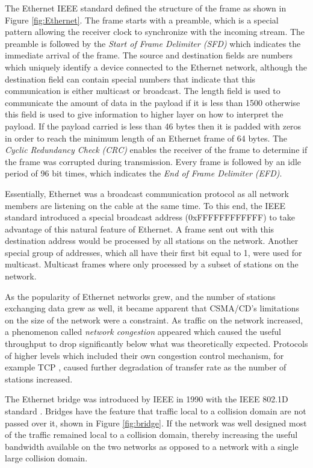 The Ethernet IEEE standard \cite{IEEE802.3} defined the structure of the frame as shown in Figure \ref{fig:Ethernet}. The frame starts with a preamble, which is a special pattern allowing the receiver clock to synchronize with the incoming stream. The preamble is followed by the \textit{Start of Frame Delimiter (SFD)} which indicates the  immediate arrival of the frame. The source and destination fields are numbers which uniquely identify a device connected to the Ethernet network, although the destination field can contain special numbers that indicate that this communication is either multicast or broadcast. The length field is used to communicate the amount of data in the payload if it is less than 1500 otherwise this field is used to give information to higher layer on how to interpret the payload. If the payload carried is less than 46 bytes then it is padded with zeros in order to reach the minimum length of an Ethernet frame of 64 bytes. The \textit{Cyclic Redundancy Check (CRC)} enables the receiver of the frame to determine if the frame was corrupted during transmission. Every frame is followed by an idle period of 96 bit times, which indicates the \textit{End of Frame Delimiter (EFD)}.

Essentially, Ethernet was a broadcast communication protocol as all network members are listening on the cable at the same time. To this end, the IEEE standard introduced a special broadcast address (0xFFFFFFFFFFFF) to take advantage of this natural feature of Ethernet. A frame sent out with this destination address would be processed by all stations on the network. Another special group of addresses, which all have their first bit equal to 1, were used for multicast. Multicast frames where only processed by a subset of stations on the network.

As the popularity of Ethernet networks grew, and the number of stations exchanging data grew as well, it became apparent that CSMA/CD's limitations on the size of the network were a constraint. As traffic on the network increased, a phenomenon called \textit{network congestion} appeared which caused the useful throughput to drop significantly below what was theoretically expected. Protocols of higher levels which included their own congestion control mechanism, for example TCP \cite{RFC793}, caused further degradation of transfer rate as the number of stations increased. 


The Ethernet bridge was introduced by IEEE in 1990 with the IEEE 802.1D standard \cite{IEEE802.1D}. Bridges have the feature that traffic local to a collision domain are not passed over it, shown in Figure \ref{fig:bridge}. If the network was well designed most of the traffic remained local to a collision domain, thereby increasing the useful bandwidth available on the two networks as opposed to a network with a single large collision domain.

